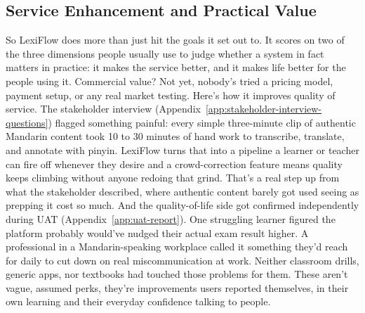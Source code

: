 \begin{enumerate}[label= (\alph*)]
\section{Service Enhancement and Practical Value}So LexiFlow does more than just hit the goals it set out to. It scores on two of the three dimensions people usually use to judge whether a system in fact matters in practice: it makes the service better, and it makes life better for the people using it. Commercial value? Not yet, nobody's tried a pricing model, payment setup, or any real market testing. Here's how it improves quality of service. The stakeholder interview (Appendix~\ref{app:stakeholder-interview-questions}) flagged something painful: every simple three-minute clip of authentic Mandarin content took 10 to 30 minutes of hand work to transcribe, translate, and annotate with pinyin. LexiFlow turns that into a pipeline a learner or teacher can fire off whenever they desire and a crowd-correction feature means quality keeps climbing without anyone redoing that grind. That's a real step up from what the stakeholder described, where authentic content barely got used seeing as prepping it cost so much. And the quality-of-life side got confirmed independently during UAT (Appendix~\ref{app:uat-report}). One struggling learner figured the platform probably would've nudged their actual exam result higher. A professional in a Mandarin-speaking workplace called it something they'd reach for daily to cut down on real miscommunication at work. Neither classroom drills, generic apps, nor textbooks had touched those problems for them. These aren't vague, assumed perks, they're improvements users reported themselves, in their own learning and their everyday confidence talking to people.

\end{enumerate}
